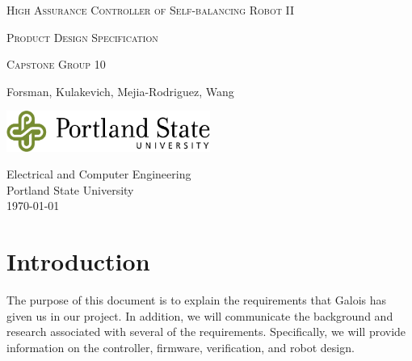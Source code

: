 \documentclass[a4paper,12pt]{article}
\newcommand{\authorname}{Forsman, Kulakevich, Mejia-Rodriguez, Wang}
\newcommand{\classnumber}{Capstone Group 10}
\newcommand{\projectname}{High Assurance Controller of Self-balancing Robot II}
\begin{document}

\begin{titlepage}
	\begin{center}
		\vspace*{1cm}

		\huge\textsc{\projectname}
		\vspace*{1cm}

		\textsc{Product Design Specification}

		\vspace{0.5cm}
		\small\textsc{\classnumber}
		
		\vspace{1.5cm}
		\normalsize \authorname 
		
		\vspace{0.5cm}
		
		\vfill
		\vspace{0.8cm}
		
		\includegraphics[width=0.5\textwidth]{images/psulogo_horiz_msword.tif}
		
		\vspace{0.5cm}
		Electrical and Computer Engineering\\
		Portland State University\\
		\today
		 
	\end{center}
\end{titlepage}
\begin{versionhistory}
    \renewcommand \vhAuthorColWidth{.8\hsize}
    \renewcommand \vhChangeColWidth{1.2\hsize}
\end{versionhistory}

\newpage
\tableofcontents 


\newpage
{}

\section{Introduction}
	The purpose of this document is to explain the requirements that Galois has given us in our project. In addition, we will communicate the background and research associated with several of the requirements. Specifically, we will provide information on the controller, firmware, verification, and robot design.
	
\end{document}
